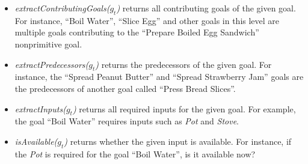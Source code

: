 \documentclass{article}
\begin{document}
\begin{itemize}[leftmargin=2pt]
  
  
  
  
  \item \textit{extractContributingGoals($g_t$)} returns all contributing goals
  of the given goal. For instance, ``Boil Water'', ``Slice Egg'' and other goals
  in this level are multiple goals contributing to the ``Prepare Boiled Egg
  Sandwich'' nonprimitive goal.
  
  \item \textit{extractPredecessors($g_t$)} returns the predecessors of the
  given goal. For instance, the ``Spread Peanut Butter'' and ``Spread
  Strawberry Jam'' goals are the predecessors of another goal called ``Press
  Bread Slices''.
  
  \item \textit{extractInputs($g_t$)} returns all required inputs for the given
  goal. For example, the goal ``Boil Water'' requires inputs such as
  \textit{Pot} and \textit{Stove}.
  
  \item \textit{isAvailable($g_t$)} returns whether the given input is
  available. For instance, if the \textit{Pot} is required for the goal
  ``Boil Water'', is it available now?
  
  

\end{itemize}
\end{document}

